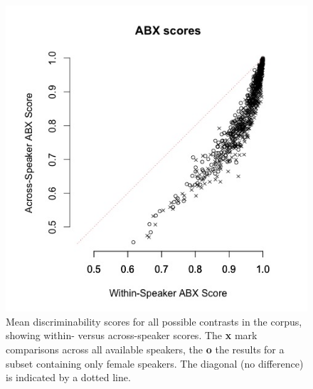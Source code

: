 \documentclass[10pt,letterpaper]{article}
\begin{document}
\vskip -0.1in
\begin{figure}[ht]
\begin{center}
\includegraphics[width=\columnwidth]{AIC_ABX_Mel_Scatter_All_Women.jpeg}
\end{center}
\vskip -0.2in
\caption{Mean discriminability scores for all possible contrasts in the corpus, showing within- versus across-speaker scores. The \textbf{x} mark comparisons across all available speakers, the \textbf{o} the results for a subset containing only female speakers. The diagonal (no difference) is indicated by a dotted line.} 
\label{fig1}
\end{figure}
\end{document}
